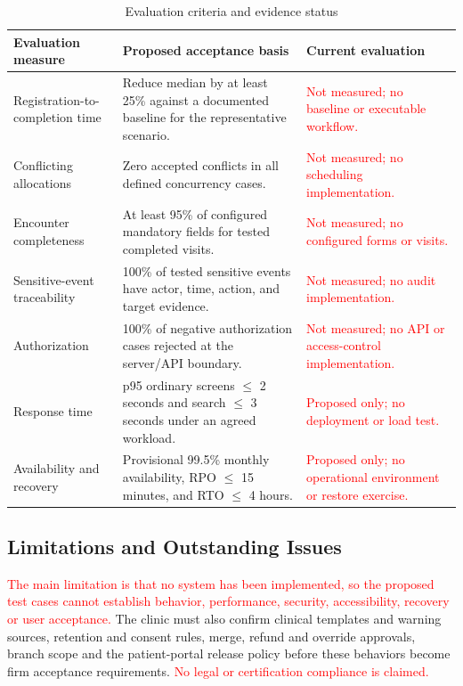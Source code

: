 \documentclass[a4paper,12pt]{article}
\newcommand{\weak}[1]{\textcolor{red}{#1}}
\begin{document}
\begin{table}[H]
\centering
\small
\renewcommand{\arraystretch}{1.10}
\begin{tabularx}{\textwidth}{@{}P{0.28\textwidth}P{0.38\textwidth}Y@{}}
\toprule
Evaluation measure & Proposed acceptance basis & Current evaluation \\
\midrule
Registration-to-completion time & Reduce median by at least 25\% against a documented baseline for the representative scenario. & \weak{Not measured; no baseline or executable workflow.} \\
Conflicting allocations & Zero accepted conflicts in all defined concurrency cases. & \weak{Not measured; no scheduling implementation.} \\
Encounter completeness & At least 95\% of configured mandatory fields for tested completed visits. & \weak{Not measured; no configured forms or visits.} \\
Sensitive-event traceability & 100\% of tested sensitive events have actor, time, action, and target evidence. & \weak{Not measured; no audit implementation.} \\
Authorization & 100\% of negative authorization cases rejected at the server/API boundary. & \weak{Not measured; no API or access-control implementation.} \\
Response time & p95 ordinary screens $\leq$ 2 seconds and search $\leq$ 3 seconds under an agreed workload. & \weak{Proposed only; no deployment or load test.} \\
Availability and recovery & Provisional 99.5\% monthly availability, RPO $\leq$ 15 minutes, and RTO $\leq$ 4 hours. & \weak{Proposed only; no operational environment or restore exercise.} \\
\bottomrule
\end{tabularx}
\caption{Evaluation criteria and evidence status}
\label{tab:requirements-evaluation}
\end{table}

\subsection{Limitations and Outstanding Issues}
\weak{The main limitation is that no system has been implemented, so the proposed test cases cannot establish behavior, performance, security, accessibility, recovery or user acceptance.} The clinic must also confirm clinical templates and warning sources, retention and consent rules, merge, refund and override approvals, branch scope and the patient-portal release policy before these behaviors become firm acceptance requirements. \weak{No legal or certification compliance is claimed.}
\end{document}
